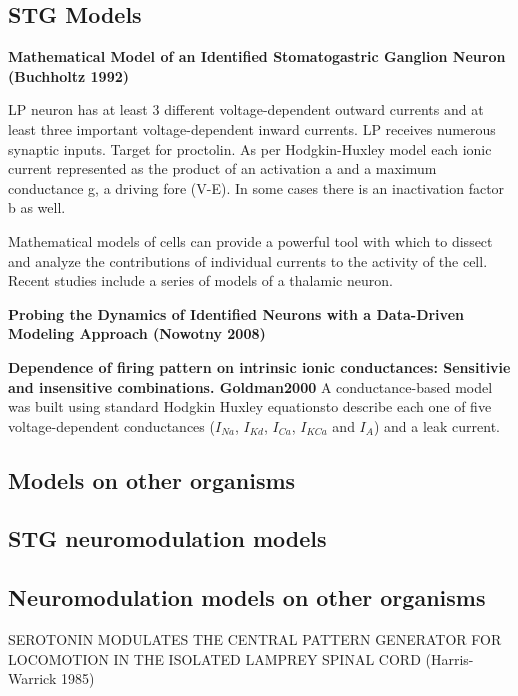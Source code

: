 \subsection{STG Models}

\textbf {Mathematical Model of an Identified Stomatogastric Ganglion Neuron (Buchholtz 1992)}

LP neuron has at least 3 different voltage-dependent outward currents and at least three important voltage-dependent inward currents. LP receives numerous synaptic inputs. Target for proctolin. As per Hodgkin-Huxley model each ionic current represented as the product of an activation a and a maximum conductance g, a driving fore (V-E). In some cases there is an inactivation factor b as well.

Mathematical models of cells can provide a powerful tool with which to dissect and analyze the contributions of individual currents to the activity of the cell. Recent studies include a series of models of a thalamic neuron.

\textbf {Probing the Dynamics of Identified Neurons with a Data-Driven Modeling Approach (Nowotny 2008)}


\textbf{Dependence of firing pattern on intrinsic ionic conductances: Sensitivie and insensitive combinations. Goldman2000}
A conductance-based model was built using standard Hodgkin Huxley equationsto describe each one of five voltage-dependent conductances ($I_{Na}$, $I_{Kd}$, $I_{Ca}$, $I_{KCa}$ and $I_{A}$)  and a leak current.

\subsection{Models on other organisms}

\subsection{STG neuromodulation models}

\subsection{Neuromodulation models on other organisms}
	SEROTONIN MODULATES THE CENTRAL PATTERN GENERATOR FOR LOCOMOTION IN THE ISOLATED LAMPREY SPINAL CORD (Harris-Warrick 1985)
	
	
	